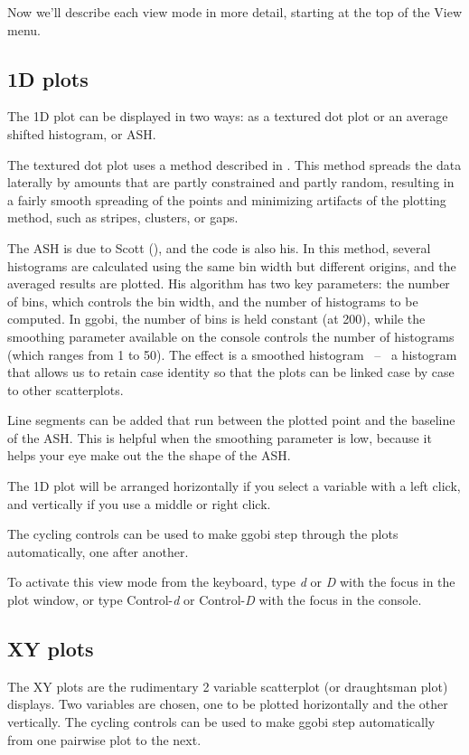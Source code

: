 \documentclass[11pt]{article}
\begin{document}
Now we'll describe each view mode in more detail, starting at the
top of the View menu. 

\subsection{1D plots}

The 1D plot can be displayed in two ways:  as a textured dot plot
or an average shifted histogram, or ASH.

The textured dot plot uses a method described in \cite{TukeyTukey90}.
This method spreads the data laterally by amounts that are partly
constrained and partly random, resulting in a fairly smooth spreading
of the points and minimizing artifacts of the plotting method, such as
stripes, clusters, or gaps.

The ASH is due to Scott (\cite{Scott92}), and the code is also his.
In this method, several histograms are calculated using the same bin
width but different origins, and the averaged results are plotted.
His algorithm has two key parameters: the number of bins, which controls
the bin width, and the number of histograms to be computed.  In ggobi,
the number of bins is held constant (at 200), while the smoothing
parameter available on the console controls the number of histograms
(which ranges from 1 to 50).  The effect is a smoothed histogram ~--~
a histogram that allows us to retain case identity so that the plots
can be linked case by case to other scatterplots.

Line segments can be added that run between the plotted point and the
baseline of the ASH.  This is helpful when the smoothing parameter is low,
because it helps your eye make out the the shape of the ASH.

The 1D plot will be arranged horizontally if you select a variable
with a left click, and vertically if you use a middle or right click.

The cycling controls can be used to make ggobi step through the
plots automatically, one after another.

To activate this view mode from the keyboard, type {\em d} or {\em D}
with the focus in the plot window, or type Control-{\em d} or
Control-{\em D} with the focus in the console.

\subsection{XY plots}

The XY plots are the rudimentary 2 variable scatterplot (or draughtsman
plot) displays. Two variables are chosen, one to be plotted horizontally
and the other vertically. The cycling controls can be used to make ggobi
step automatically from one pairwise plot to the next.
\end{document}
